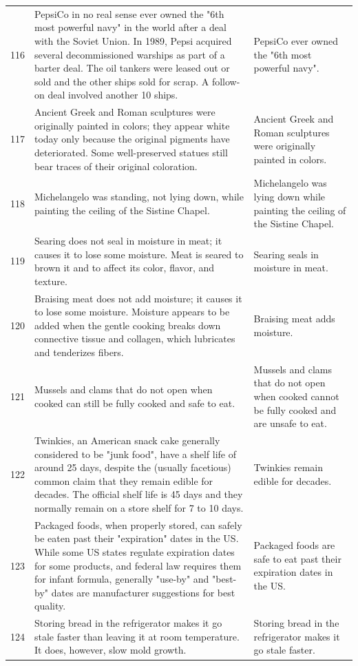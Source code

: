 \begin{tabular}{c|p{}|p{}}
116 & PepsiCo in no real sense ever owned the "6th most powerful navy" in the world after a deal with the Soviet Union. In 1989, Pepsi acquired several decommissioned warships as part of a barter deal. The oil tankers were leased out or sold and the other ships sold for scrap. A follow-on deal involved another 10 ships. & PepsiCo ever owned the "6th most powerful navy". \\
117 & Ancient Greek and Roman sculptures were originally painted in colors; they appear white today only because the original pigments have deteriorated. Some well-preserved statues still bear traces of their original coloration. & Ancient Greek and Roman sculptures were originally painted in colors. \\
118 & Michelangelo was standing, not lying down, while painting the ceiling of the Sistine Chapel. & Michelangelo was lying down while painting the ceiling of the Sistine Chapel. \\
119 & Searing does not seal in moisture in meat; it causes it to lose some moisture. Meat is seared to brown it and to affect its color, flavor, and texture. & Searing seals in moisture in meat. \\
120 & Braising meat does not add moisture; it causes it to lose some moisture. Moisture appears to be added when the gentle cooking breaks down connective tissue and collagen, which lubricates and tenderizes fibers. & Braising meat adds moisture. \\
121 & Mussels and clams that do not open when cooked can still be fully cooked and safe to eat. & Mussels and clams that do not open when cooked cannot be fully cooked and are unsafe to eat. \\
122 & Twinkies, an American snack cake generally considered to be "junk food", have a shelf life of around 25 days, despite the (usually facetious) common claim that they remain edible for decades. The official shelf life is 45 days and they normally remain on a store shelf for 7 to 10 days. & Twinkies remain edible for decades. \\
123 & Packaged foods, when properly stored, can safely be eaten past their "expiration" dates in the US. While some US states regulate expiration dates for some products, and federal law requires them for infant formula, generally "use-by" and "best-by" dates are manufacturer suggestions for best quality. & Packaged foods are safe to eat past their expiration dates in the US. \\
124 & Storing bread in the refrigerator makes it go stale faster than leaving it at room temperature. It does, however, slow mold growth. & Storing bread in the refrigerator makes it go stale faster. \\

\end{tabular}
